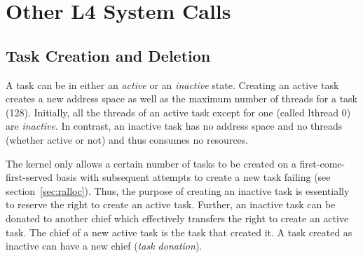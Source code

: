 %




\chapter{\label{c:other}Other L4 System Calls}




\section{Task Creation and Deletion}


\label{sec:tasks}

A task can be in either an \emph{active} or an \emph{inactive} state.
Creating an active task creates a new address space as well as the
maximum number of threads for a task (128). Initially, all the threads
of an active task except for one (called lthread 0) are
\emph{inactive}. In contrast, an inactive task has no address space
and no threads (whether active or not) and thus consumes no resources.

The kernel only allows a certain number of tasks to be created on a
first-come-first-served basis with subsequent attempts to create a new
task failing (see section~\ref{sec:ralloc}). Thus, the purpose of
creating an inactive task is essentially to reserve the right to create
an active task. Further, an inactive task can be donated to another
chief which effectively transfers the right to create an active
task. The chief of a new active task is the task that created it. A task
created as inactive can have a new chief (\emph{task donation}).

